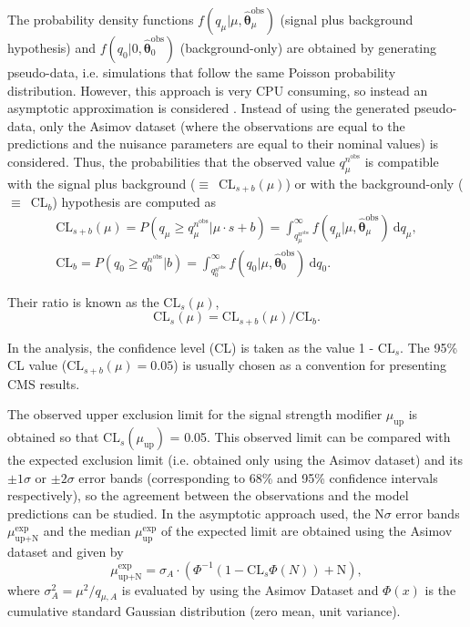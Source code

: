 \documentclass[../main.tex]{subfiles}
\begin{document}
The probability density functions $f(q_\mu|\mu,\boldsymbol{\hat{\theta}}_\mu^\text{obs})$ (signal plus background hypothesis) and $f(q_0|0,\boldsymbol{\hat{\theta}}_0^\text{obs})$ (background-only) are obtained by generating pseudo-data, i.e. simulations that follow the same Poisson probability distribution. However, this approach is very CPU consuming, so instead an asymptotic approximation is considered \cite{hh:results:asymptotic}. Instead of using the generated pseudo-data, only the Asimov dataset (where the observations are equal to the predictions and the nuisance parameters are equal to their nominal values) is considered. Thus, the probabilities that the observed value $q_\mu^{n^{\text{obs}}}$ is compatible with the signal plus background ($\equiv$~CL$_{s+b}(\mu)$) or with the background-only ($\equiv$~CL$_{b}$) hypothesis are computed as
\begin{equation}
\begin{matrix}
\text{CL}_{s+b}(\mu) = P(q_\mu \geq q_\mu^{n^{\text{obs}}} | \mu\cdot s + b) = \int_{q_\mu^{n^{\text{obs}}}}^\infty f(q_\mu|\mu, \boldsymbol{\hat{\theta}}_\mu^\text{obs})~\text{d}q_\mu, \\
\text{CL}_{b} = P(q_0 \geq q_0^{n^{\text{obs}}} | b) = \int_{q_0^{n^{\text{obs}}}}^\infty f(q_0|\mu, \boldsymbol{\hat{\theta}}_0^\text{obs})~\text{d}q_0.
\end{matrix}
\end{equation}

Their ratio is known as the $\text{CL}_{s}(\mu)$,
\begin{equation}
\text{CL}_{s}(\mu) = \text{CL}_{s+b}(\mu) / \text{CL}_{b}.
\end{equation}

In the \hhbbtt{} analysis, the confidence level (CL) is taken as the value 1 - $\text{CL}_{s}$. The 95\% CL value ($\text{CL}_{s+b}(\mu) = 0.05$) is usually chosen as a convention for presenting CMS results.

The observed upper exclusion limit for the signal strength modifier $\mu_{\text{up}}$ is obtained so that $\text{CL}_{s}(\mu_{\text{up}})$ = 0.05. This observed limit can be compared with the expected exclusion limit (i.e. obtained only using the Asimov dataset) and its $\pm1\sigma$ or $\pm2\sigma$ error bands (corresponding to 68\% and 95\% confidence intervals respectively), so the agreement between the observations and the model predictions can be studied. In the asymptotic approach used, the N$\sigma$ error bands $\mu_{\text{up+N}}^\text{exp}$ and the median $\mu_{\text{up}}^\text{exp}$ of the expected limit are obtained using the Asimov dataset and given by \cite{hh:results:asymptotic}
\begin{equation}
\mu_{\text{up+N}}^\text{exp} = \sigma_A\cdot\left(\Phi^{-1}(1 - \text{CL}_s\Phi(N)) + \text{N}  \right),
\end{equation}
where $\sigma^2_A=\mu^2/q_{\mu, A}$ is evaluated by using the Asimov Dataset and $\Phi(x)$ is the cumulative standard Gaussian distribution (zero mean, unit variance).
\end{document}
